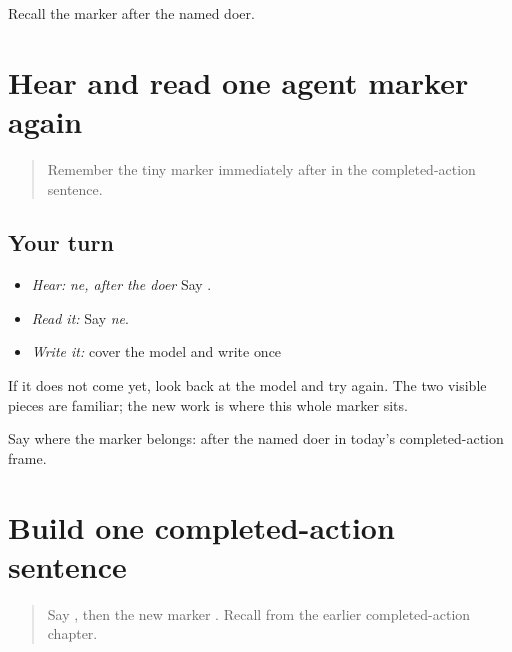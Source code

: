 \begin{tcolorbox}[breakable,colback=teal!4,colframe=teal!35!black,title={Before you move on}]
Recall the marker after the named doer.
\end{tcolorbox}
\section[\texorpdfstring{\pa{ਨੇ} (ne)}{ਨੇ (ne)}]{Hear and read one agent marker again}

\label{lesson:PA-C210-ne-review}



\begin{quote}
Remember the tiny marker immediately after \textbf{} in the completed-action sentence.
\end{quote}

\subsection*{Your turn}
\begin{itemize}
\raggedright
  \item \emph{Hear:} \emph{ne, after the doer} Say \textbf{}.
  \item \emph{Read it:} \textbf{} Say \emph{ne}.
  \item \emph{Write it:} cover the model and write \textbf{} once
\end{itemize}

If it does not come yet, look back at the model and try again. The two visible pieces are familiar; the new work is where this whole marker sits.

\begin{tcolorbox}[breakable,colback=teal!4,colframe=teal!35!black,title={Before you move on}]
Say where the marker belongs: after the named doer in today's completed-action frame.
\end{tcolorbox}
\section[\texorpdfstring{\pa{ਅਮਨ} \pa{ਨੇ} \pa{ਕੰਮ} \pa{ਕੀਤਾ} (Aman ne kamm kiitaa)}{ਅਮਨ ਨੇ ਕੰਮ ਕੀਤਾ (Aman ne kamm kiitaa)}]{Build one completed-action sentence}

\label{lesson:PA-C210-aman-did-work}



\begin{quote}
Say \textbf{}, then the new marker \textbf{}. Recall \textbf{ } from the earlier completed-action chapter.
\end{quote}

